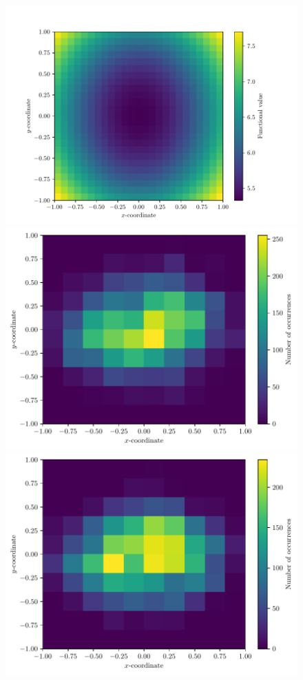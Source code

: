 \documentclass[runningheads]{llncs}
\begin{document}
\begin{figure}[h!]
\centering
\begin{minipage}{\textwidth}
  \centering
    \includegraphics[scale=.26]{density_squeeze.pdf}
    \includegraphics[scale=.26]{centroid_heat_0_squeeze.pdf}
    \includegraphics[scale=.26]{centroid_heat_1_squeeze.pdf}\\[0.23cm]

\end{minipage}
\end{figure}
\end{document}
